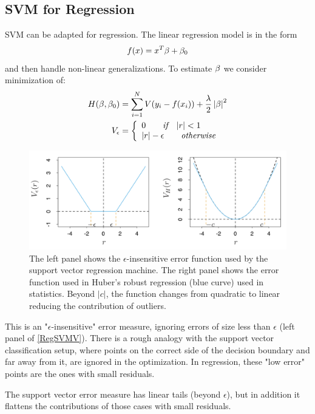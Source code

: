 \subsection{SVM for Regression}
SVM can be adapted for regression. The linear regression model is in the form
\begin{equation}
f(x) = x^T\mathbf{\beta}+\mathbf{\beta}_0
\end{equation}
and then handle non-linear generalizations. To estimate $\mathbf{\beta}$ we consider minimization of:
\begin{equation}
\begin{aligned}
H(\be, \be_0) &= \sum_{i=1}^NV\br{y_i - f(x_i)}+\frac{\lambda}{2}\left|\be\right|^2\\
V_\epsilon &=\left\{\begin{array}{ll}0 \quad \quad \textit{if}\quad |r|<1 \\ 
 |r|-\epsilon  \quad \quad \textit{otherwise}
\end{array} 
\right.
\end{aligned}
\end{equation}
\begin{figure}
\centering
\includegraphics[width=\textwidth]{img/regSVMV}
\caption{The left panel shows the $\epsilon$-insensitive error function used by the support vector regression machine. The right panel shows the error function used in Huber’s robust regression (blue curve) used in statistics. Beyond $|c|$, the function changes from quadratic to linear reducing the contribution of outliers.}
\label{RegSVMV}
\end{figure}
This is an "$\epsilon$-insensitive" error measure, ignoring errors of size less than $\epsilon$ (left panel of \autoref{RegSVMV}). There is a rough analogy with the support vector classification setup, where points on the correct side of the decision boundary and far away from it, are ignored in the optimization. In regression, these "low error" points are the ones with small residuals.

The support vector error measure has linear tails (beyond $\epsilon$), but in addition it flattens the contributions of those cases with small residuals.

